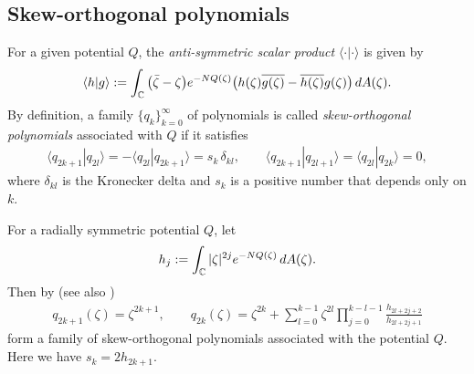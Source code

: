 \documentclass[11pt]{article}
\numberwithin{equation}{section}
\numberwithin{equation}{section}
\newcommand{\C}{{\mathbb C}}
\newcommand{\1}{\chi}
\begin{document}
\setcounter{section}{3}\setcounter{subsection}{0}\setcounter{equation}{0}
\subsection{Skew-orthogonal polynomials}
For a given potential $Q$, the \textit{anti-symmetric scalar product} $\langle \cdot | \cdot \rangle$ is given by
\begin{gather*}
	\langle h|g \rangle:= \int_\C \big( \bar{\zeta}-\zeta \big) {\rm e}^{-N Q(\zeta) } \big( h(\zeta) \overline{g(\zeta)}-\overline{h(\zeta)}g(\zeta) \big) \, {\rm d}A(\zeta).
\end{gather*}
By definition, a family $\{ q_k \}_{k=0}^\infty$ of polynomials is called
\textit{skew-orthogonal polynomials} associated with $Q$ if it satisfies
\begin{gather*}
	\langle q_{2k+1} | q_{2l} \rangle=-\langle q_{2l} | q_{2k+1} \rangle =s_k \, \delta_{kl}, \qquad \langle q_{2k+1} | q_{2l+1} \rangle=\langle q_{2l} | q_{2k} \rangle=0,
\end{gather*}
where $\delta_{kl}$ is the Kronecker delta and $s_k$ is a positive number that depends only on $k$.

For a radially symmetric potential $Q$, let
\begin{gather*}
	h_j:=\int_\C |\zeta|^{2j} {\rm e}^{-N Q(\zeta)} \, {\rm d}A(\zeta).
\end{gather*}
Then by \cite[Theorem 3.1]{akemann2021skew} (see also \cite[p.~7]{MR3066113})
\begin{gather} \label{skew op_rad}
	q_{2k+1}(\zeta)=\zeta^{2k+1}, \qquad q_{2k}(\zeta)=\zeta^{2k}+\sum_{l=0}^{k-1} \zeta^{2l} \prod_{j=0}^{k-l-1} \frac{h_{2l+2j+2} }{ h_{2l+2j+1} }
\end{gather}
form a family of skew-orthogonal polynomials associated with the potential $Q$. Here we have $s_k=2h_{2k+1}.$
\end{document}
